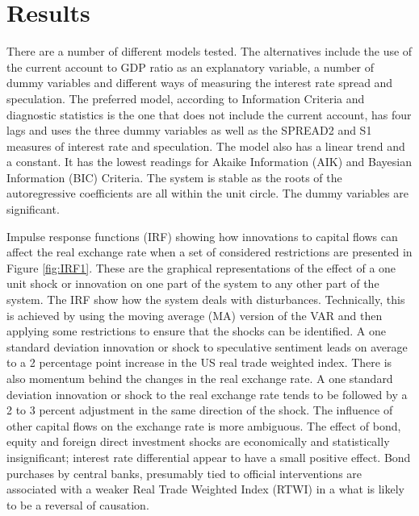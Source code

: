 \documentclass[jrfm,article,accept,moreauthors,pdftex]{Definitions/mdpi}
\begin{document}
 

\section{Results}\label{sec4}

There are a number of different models tested.  The alternatives include the use of the current account to GDP ratio as an explanatory variable, a number of dummy variables and different ways of measuring the interest rate spread and speculation. The preferred model, according to Information Criteria and diagnostic statistics is the one that does not include the current account, has four lags and uses the three dummy variables as well as the SPREAD2 and S1 measures of interest rate and speculation.  The model also has a linear trend and a constant. It has the lowest readings for Akaike Information (AIK) and Bayesian Information (BIC) Criteria.  The system is stable as the roots of the autoregressive coefficients are all within the unit circle.  The dummy variables are significant. 

Impulse response functions (IRF) showing how innovations to capital flows can affect the real exchange rate when a set of considered restrictions are presented in Figure \ref{fig:IRF1}. These are the graphical representations of the effect of a one unit shock or innovation on one part of the system to any other part of the system.  The IRF show how the system deals with disturbances.  Technically, this is achieved by using the moving average (MA) version of the VAR and then applying some restrictions to ensure that the shocks can be identified.  A one standard deviation innovation or shock to speculative sentiment leads on average to a 2 percentage point increase in the US real trade weighted index. There is also momentum behind the changes in the real exchange rate.  A one standard deviation innovation or shock to the real exchange rate tends to be followed by a 2 to 3 percent adjustment in the same direction of the shock. The influence of other capital flows on the exchange rate is more ambiguous.  The effect of bond, equity and foreign direct investment shocks are economically and statistically insignificant; interest rate differential appear to have a small positive effect. Bond purchases by central banks, presumably tied to official interventions are associated with a weaker Real Trade Weighted Index (RTWI) in a what is likely to be a reversal of causation. 
\end{document}
